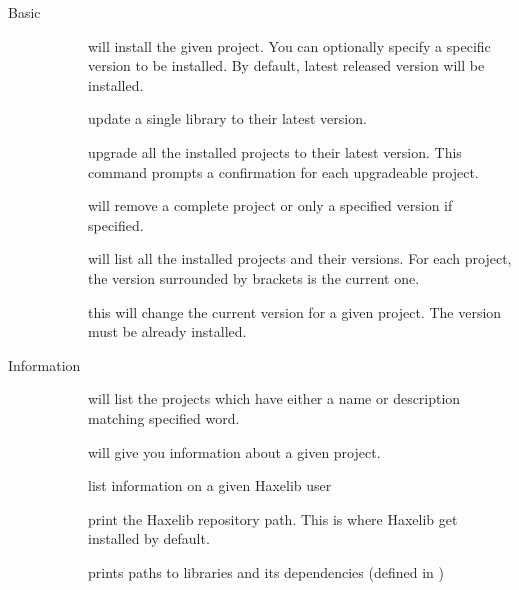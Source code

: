 \begin{description}
	\item[Basic]
		\begin{description}
			\item[] will install the given project. You can optionally specify a specific version to be installed. By default, latest released version will be installed.
			\item[] update a single library to their latest version. 
			\item[] upgrade all the installed projects to their latest version. This command prompts a confirmation for each upgradeable project.
			\item[] will remove a complete project or only a specified version if specified.
			\item[] will list all the installed projects and their versions. For each project, the version surrounded by brackets is the current one.
			\item[] this will change the current version for a given project. The version must be already installed.
		\end{description}
		
	\item[Information]
		\begin{description}
			\item[] will list the projects which have either a name or description matching specified word.
			\item[] will give you information about a given project.
			\item[] list information on a given Haxelib user
			\item[] print the Haxelib repository path. This is where Haxelib get installed by default.
			\item[] prints paths to libraries and its dependencies (defined in )
		\end{description}
		

\end{description}
